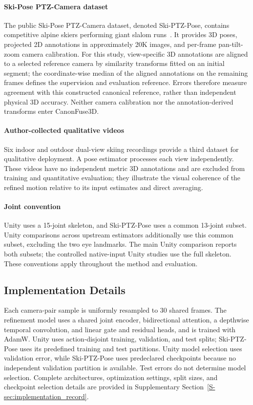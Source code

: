 \documentclass[preprint,12pt]{elsarticle}
\begin{document}
\paragraph{Ski-Pose PTZ-Camera dataset}
The public Ski-Pose PTZ-Camera dataset, denoted Ski-PTZ-Pose, contains competitive alpine skiers performing giant slalom runs~\cite{rhodin2018learning,ski_poseptz_dataset}. It provides 3D poses, projected 2D annotations in approximately 20K images, and per-frame pan-tilt-zoom camera calibration. For this study, view-specific 3D annotations are aligned to a selected reference camera by similarity transforms fitted on an initial segment; the coordinate-wise median of the aligned annotations on the remaining frames defines the supervision and evaluation reference. Errors therefore measure agreement with this constructed canonical reference, rather than independent physical 3D accuracy. Neither camera calibration nor the annotation-derived transforms enter CanonFuse3D.

\paragraph{Author-collected qualitative videos}
Six indoor and outdoor dual-view skiing recordings provide a third dataset for qualitative deployment. A pose estimator processes each view independently. These videos have no independent metric 3D annotations and are excluded from training and quantitative evaluation; they illustrate the visual coherence of the refined motion relative to its input estimates and direct averaging.

\paragraph{Joint convention}
Unity uses a 15-joint skeleton, and Ski-PTZ-Pose uses a common 13-joint subset. Unity comparisons across upstream estimators additionally use this common subset, excluding the two eye landmarks. The main Unity comparison reports both subsets; the controlled native-input Unity studies use the full skeleton. These conventions apply throughout the method and evaluation.

\subsection{Implementation Details}
\label{subsec:implementation_details}

Each camera-pair sample is uniformly resampled to 30 shared frames. The refinement model uses a shared joint encoder, bidirectional attention, a depthwise temporal convolution, and linear gate and residual heads, and is trained with AdamW. Unity uses action-disjoint training, validation, and test splits; Ski-PTZ-Pose uses its predefined training and test partitions. Unity model selection uses validation error, while Ski-PTZ-Pose uses predeclared checkpoints because no independent validation partition is available. Test errors do not determine model selection. Complete architectures, optimization settings, split sizes, and checkpoint selection details are provided in Supplementary Section~\ref{S-sec:implementation_record}.
\end{document}

